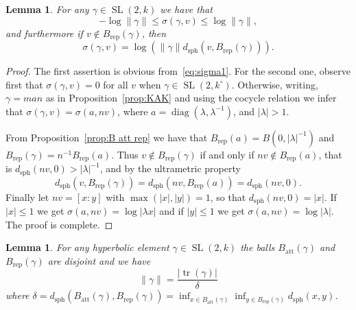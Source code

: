 \documentclass[11pt]{article}
\newtheorem{lemm}[theo]{Lemma}
\theoremstyle{definition}
\numberwithin{equation}{section}
\numberwithin{figure}{section}
\numberwithin{table}{section}
\DeclareMathOperator{\tr}{tr}
\DeclareMathOperator{\sph}{sph}
\DeclareMathOperator{\SL}{SL}
\DeclareMathOperator{\diag}{diag}
\newcommand{\abs}[1]{\left\vert#1\right\vert}
\newcommand{\lrpar}[1]{\left(#1\right)}
\newcommand{\la}{\lambda}
\newcommand{\att}{\mathrm{att}}
\newcommand{\rep}{\mathrm{rep}}
\newcommand{\inv}{^{-1}}
\begin{document}
\begin{lemm}\label{lem:expand vector 1}
For any $\gamma\in \SL(2,k)$ we have that
\[
- \log \|\gamma\| \le \sigma(\gamma,v) \le \log\|\gamma\|,
\]
and furthermore if $v\notin B_\rep(\gamma)$, then
\[
\sigma(\gamma,v) = \log\lrpar{\|\gamma\| d_{\mathrm{sph}}(v,B_\rep(\gamma))}.
\]
\end{lemm}

\begin{proof}
The first assertion is obvious from~\eqref{eq:sigma1}. For the second one, observe first that $\sigma(\gamma,v) = 0$ for all $v$ when $\gamma\in \SL(2,k^\circ)$. Otherwise, writing, $ \gamma = m a n$ as in Proposition~\ref{prop:KAK} and using the cocycle relation we infer that $\sigma(\gamma, v) = \sigma(a, nv)$, where $a = \diag(\lambda, \lambda^{-1})$, and $\abs{\lambda}>1$.

From Proposition~\ref{prop:B att rep} we have that $B_{\rep}(a) = B(0, \abs{\la}^{-1})$ and $B_{\rep}(\gamma) = n^{-1}B_{\rep}(a)$. Thus $v\notin B_{\rep}(\gamma)$ if and only if $nv\notin B_{\rep}(a)$, that is $d_{\mathrm{sph}}(nv, 0) > \abs{\lambda}\inv$, and by the ultrametric property
\[
d_{\mathrm{sph}}(v, B_{\rep}(\gamma)) =d_{\mathrm{sph}}(nv, B_{\rep}(a))= d_{\mathrm{sph}}(nv, 0).
\]
Finally let $nv = [x:y]$ with $\max(\abs{x}, \abs{y}) = 1$, so that $d_{\mathrm{sph}}(nv, 0) = \abs{x}$. If $\abs{x}\leq 1$ we get $\sigma(a,nv) = \log \abs{\lambda x} $ and if $\abs{y}\leq 1$ we get $\sigma(a,nv) = \log \abs{\lambda}$. The proof is complete.
\end{proof}

\begin{lemm}\label{lem:expand vector 2}
For any \emph{hyperbolic} element $\gamma\in \SL(2,k)$ the balls $B_\att(\gamma)$ and $B_\rep(\gamma)$ are disjoint and we have
\begin{equation}\label{eq:expand}
\|\gamma\| = \frac{\mathopen|\tr(\gamma)\mathclose|}{\delta}
\end{equation}
where $\delta = d_{\sph} (B_\att(\gamma), B_\rep(\gamma)) =\inf_{x\in B_\att(\gamma)} \inf_{y\in B_\rep(\gamma)} d_{\sph}(x,y)$.
\end{lemm}
\end{document}
